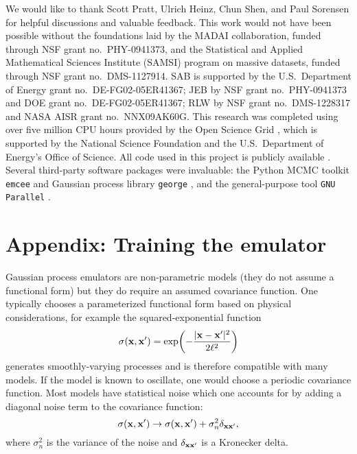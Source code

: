 \documentclass[aps,prc,reprint,superscriptaddress,amsmath]{revtex4-1}
\begin{document}
\begin{acknowledgments}
We would like to thank Scott Pratt, Ulrich Heinz, Chun Shen, and Paul Sorensen for helpful discussions and valuable feedback.
This work would not have been possible without the foundations laid by the MADAI collaboration, funded through NSF grant no.~PHY-0941373, and the Statistical and Applied Mathematical Sciences Institute (SAMSI) program on massive datasets, funded through NSF grant no.~DMS-1127914.
SAB is supported by the U.S.\ Department of Energy grant no.~DE-FG02-05ER41367;
JEB by NSF grant no.~PHY-0941373 and DOE grant no.~DE-FG02-05ER41367;
RLW by NSF grant no.~DMS-1228317 and NASA AISR grant no.~NNX09AK60G.
This research was completed using over five million CPU hours provided by the Open Science Grid \cite{Pordes:2007zzb,Sfiligoi:2010zz}, which is supported by the National Science Foundation and the U.S.\ Department of Energy's Office of Science.
All code used in this project is publicly available \cite{Bernhard:2015mtd}.
Several third-party software packages were invaluable:
the Python MCMC toolkit \texttt{emcee} \cite{FM:2013mc} and Gaussian process library \texttt{george} \cite{Ambikasaran:2014gp}, and the general-purpose tool \texttt{GNU Parallel} \cite{Tange:2011pa}.
\end{acknowledgments}


\appendix

\section*{\label{app:train}Appendix: Training the emulator}
\renewcommand{\theequation}{A\arabic{equation}}
\setcounter{equation}{0}

\newcommand{\vectheta}{\boldsymbol\theta}

Gaussian process emulators are non-parametric models (they do not assume a functional form) but they do require an assumed covariance function.
One typically chooses a parameterized functional form based on physical considerations, for example the squared-exponential function
\begin{equation*}
  \sigma(\mathbf x, \mathbf x') = \exp\biggl( -\frac{|\mathbf x - \mathbf x'|^2}{2\ell^2} \biggr)
\end{equation*}
generates smoothly-varying processes and is therefore compatible with many models.
If the model is known to oscillate, one would choose a periodic covariance function.
Most models have statistical noise which one accounts for by adding a diagonal noise term to the covariance function:
\begin{equation*}
  \sigma(\mathbf x, \mathbf x') \rightarrow \sigma(\mathbf x, \mathbf x') + \sigma_n^2\delta_{\mathbf x\mathbf x'},
\end{equation*}
where $\sigma_n^2$ is the variance of the noise and $\delta_{\mathbf x\mathbf x'}$ is a Kronecker delta.
\end{document}
